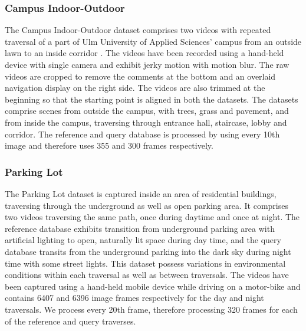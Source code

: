 \documentclass[letterpaper, 10 pt, conference]{ieeeconf}  %
\begin{document}
\subsubsection{Campus Indoor-Outdoor}
The Campus Indoor-Outdoor dataset comprises two videos with repeated traversal of a part of Ulm University of Applied Sciences' campus from an outside lawn to an inside corridor \cite{indoorOutdoor1}. The videos have been recorded using a hand-held device with single camera and exhibit jerky motion with motion blur. The raw videos are cropped to remove the comments at the bottom and an overlaid navigation display on the right side. The videos are also trimmed at the beginning so that the starting point is aligned in both the datasets. The datasets comprise scenes from outside the campus, with trees, grass and pavement, and from inside the campus, traversing through entrance hall, staircase, lobby and corridor. The reference and query database is processed by using every 10th image and therefore uses 355 and 300 frames respectively.

\subsubsection{Parking Lot}
The Parking Lot dataset is captured inside an area of residential buildings, traversing through the underground as well as open parking area. It comprises two videos traversing the same path, once during daytime and once at night. The reference database exhibits transition from underground parking area with artificial lighting to open, naturally lit space during day time, and the query database transits from the underground parking into the dark sky during night time with some street lights. This dataset possess variations in environmental conditions within each traversal as well as between traversals. The videos have been captured using a hand-held mobile device while driving on a motor-bike and contains 6407 and 6396 image frames respectively for the day and night traversals. We process every 20th frame, therefore processing 320 frames for each of the reference and query traverses.
\end{document}
